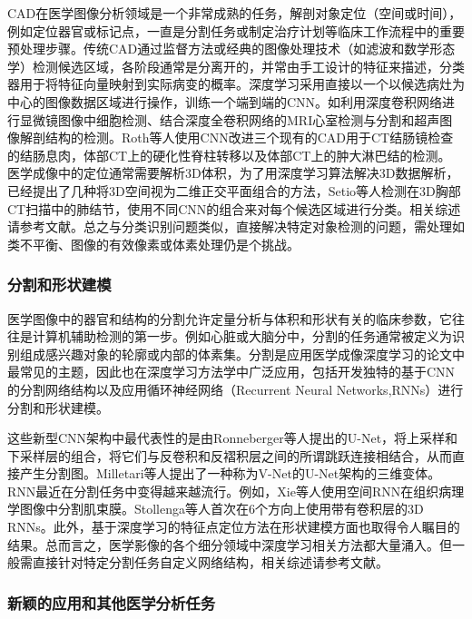 CAD在医学图像分析领域是一个非常成熟的任务，解剖对象定位（空间或时间），例如定位器官或标记点，一直是分割任务或制定治疗计划等临床工作流程中的重要预处理步骤。传统CAD\citep{Van2011Computer}通过监督方法或经典的图像处理技术（如滤波和数学形态学）检测候选区域，各阶段通常是分离开的，并常由手工设计的特征来描述，分类器用于将特征向量映射到实际病变的概率。深度学习采用直接以一个以候选病灶为中心的图像数据区域进行操作，训练一个端到端的CNN。如利用深度卷积网络进行显微镜图像中细胞检测\citep{Akram2016}、结合深度全卷积网络的MRI心室检测与分割\citep{Emad2015,Tran2016a}和超声图像解剖结构的检测\citep{Chen2016i}。Roth等人\citep{Roth2016}使用CNN改进三个现有的CAD用于CT结肠镜检查的结肠息肉，体部CT上的硬化性脊柱转移以及体部CT上的肿大淋巴结的检测。
医学成像中的定位通常需要解析3D体积，为了用深度学习算法解决3D数据解析，已经提出了几种将3D空间视为二维正交平面组合的方法，Setio等人\citep{Setio2016Pulmonary}检测在3D胸部CT扫描中的肺结节，使用不同CNN的组合来对每个候选区域进行分类。相关综述请参考文献\citep{Shin2016}。总之与分类识别问题类似，直接解决特定对象检测的问题，需处理如类不平衡、图像的有效像素或体素处理仍是个挑战。

\subsubsection{分割和形状建模}

医学图像中的器官和结构的分割允许定量分析与体积和形状有关的临床参数，它往往是计算机辅助检测的第一步。例如心脏或大脑分中，分割的任务通常被定义为识别组成感兴趣对象的轮廓或内部的体素集。分割是应用医学成像深度学习的论文中最常见的主题，因此也在深度学习方法学中广泛应用，包括开发独特的基于CNN的分割网络结构以及应用循环神经网络（Recurrent Neural Networks,RNNs）进行分割和形状建模。

这些新型CNN架构中最代表性的是由Ronneberger等人\citep{Ronneberger2015}提出的U-Net，将上采样和下采样层的组合，将它们与反卷积和反褶积层之间的所谓跳跃连接相结合，从而直接产生分割图。Milletari等人\citep{Milletari2016}提出了一种称为V-Net的U-Net架构的三维变体。RNN最近在分割任务中变得越来越流行。例如，Xie等人\citep{xie2016}使用空间RNN在组织病理学图像中分割肌束膜。Stollenga等人\citep{cortes2015}首次在6个方向上使用带有卷积层的3D RNNs。此外，基于深度学习的特征点定位方法\citep{Trigeorgis2016}在形状建模方面也取得令人瞩目的结果。总而言之，医学影像的各个细分领域中深度学习相关方法都大量涌入。但一般需直接针对特定分割任务自定义网络结构，相关综述请参考文献。

\subsubsection{新颖的应用和其他医学分析任务}
\label{sec:applications_various}

